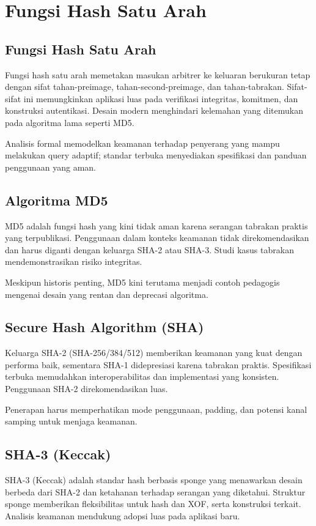 \documentclass[../main.tex]{subfiles}
\begin{document}
\chapter{Fungsi Hash Satu Arah}

\section{Fungsi Hash Satu Arah}
Fungsi hash satu arah memetakan masukan arbitrer ke keluaran berukuran tetap dengan sifat tahan-preimage, tahan-second-preimage, dan tahan-tabrakan. Sifat-sifat ini memungkinkan aplikasi luas pada verifikasi integritas, komitmen, dan konstruksi autentikasi. Desain modern menghindari kelemahan yang ditemukan pada algoritma lama seperti MD5.

Analisis formal memodelkan keamanan terhadap penyerang yang mampu melakukan query adaptif; standar terbuka menyediakan spesifikasi dan panduan penggunaan yang aman.

\section{Algoritma MD5}
MD5 adalah fungsi hash yang kini tidak aman karena serangan tabrakan praktis yang terpublikasi. Penggunaan dalam konteks keamanan tidak direkomendasikan dan harus diganti dengan keluarga SHA-2 atau SHA-3. Studi kasus tabrakan mendemonstrasikan risiko integritas.

Meskipun historis penting, MD5 kini terutama menjadi contoh pedagogis mengenai desain yang rentan dan deprecasi algoritma.

\section{Secure Hash Algorithm (SHA)}
Keluarga SHA-2 (SHA-256/384/512) memberikan keamanan yang kuat dengan performa baik, sementara SHA-1 didepresiasi karena tabrakan praktis. Spesifikasi terbuka memudahkan interoperabilitas dan implementasi yang konsisten. Penggunaan SHA-2 direkomendasikan luas.

Penerapan harus memperhatikan mode penggunaan, padding, dan potensi kanal samping untuk menjaga keamanan.

\section{SHA-3 (Keccak)}
SHA-3 (Keccak) adalah standar hash berbasis sponge yang menawarkan desain berbeda dari SHA-2 dan ketahanan terhadap serangan yang diketahui. Struktur sponge memberikan fleksibilitas untuk hash dan XOF, serta konstruksi terkait. Analisis keamanan mendukung adopsi luas pada aplikasi baru.
\end{document}
